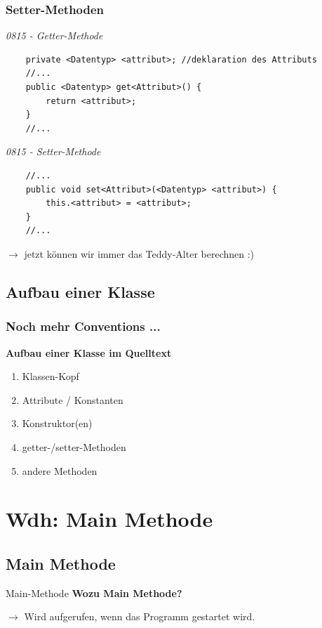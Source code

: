 \documentclass[18pt]{beamer}
\begin{document}

\begin{frame}[containsverbatim]
	\frametitle{Setter-Methoden}
		\emph{0815 - Getter-Methode}
		\begin{lstlisting}
	private <Datentyp> <attribut>; //deklaration des Attributs
	//...
	public <Datentyp> get<Attribut>() {
		return <attribut>;
	}
	//...
		\end{lstlisting} 
		
	\emph{0815 - Setter-Methode}
		\begin{lstlisting}
	//...
	public void set<Attribut>(<Datentyp> <attribut>) {
		this.<attribut> = <attribut>;
	}
	//...
		\end{lstlisting} 
		
		\pause $\rightarrow$ jetzt können wir immer das Teddy-Alter berechnen :)

\end{frame}


\subsection{Aufbau einer Klasse}
\begin{frame}
	\frametitle{Noch mehr Conventions ...}
	\textbf{Aufbau einer Klasse im Quelltext}
		\begin{enumerate}
			\item Klassen-Kopf  \pause
			\item Attribute / Konstanten  \pause
			\item Konstruktor(en)  \pause
			\item getter-/setter-Methoden  \pause
			\item andere Methoden  \pause
		\end{enumerate}
\end{frame}


\section{Wdh: Main Methode}
\subsection{Main Methode}
\begin{frame}{Main-Methode}
	\textbf{Wozu Main Methode?} \pause
	
	$\rightarrow$ Wird aufgerufen, wenn das Programm gestartet wird.\pause
\end{frame}
\end{document}
